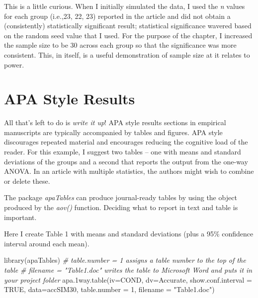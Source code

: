 \documentclass[
  english,
]{book}
\newenvironment{Shaded}{\begin{snugshade}}{\end{snugshade}}
\newcommand{\AttributeTok}[1]{\textcolor[rgb]{0.77,0.63,0.00}{#1}}
\newcommand{\CommentTok}[1]{\textcolor[rgb]{0.56,0.35,0.01}{\textit{#1}}}
\newcommand{\ConstantTok}[1]{\textcolor[rgb]{0.00,0.00,0.00}{#1}}
\newcommand{\DecValTok}[1]{\textcolor[rgb]{0.00,0.00,0.81}{#1}}
\newcommand{\FunctionTok}[1]{\textcolor[rgb]{0.00,0.00,0.00}{#1}}
\newcommand{\NormalTok}[1]{#1}
\newcommand{\StringTok}[1]{\textcolor[rgb]{0.31,0.60,0.02}{#1}}
\begin{document}
This is a little curious. When I initially simulated the data, I used the \emph{n} values for each group (i.e.,23, 22, 23) reported in the article \citep{tran_you_2014} and did not obtain a (consistently) statistically significant result; statistical significance wavered based on the random seed value that I used. For the purpose of the chapter, I increased the sample size to be 30 across each group so that the significance was more consistent. This, in itself, is a useful demonstration of sample size at it relates to power.

\hypertarget{apa-style-results}{%
\section{APA Style Results}\label{apa-style-results}}

All that's left to do is \emph{write it up}! APA style results sections in empirical manuscripts are typically accompanied by tables and figures. APA style discourages repeated material and encourages reducing the cognitive load of the reader. For this example, I suggest two tables -- one with means and standard deviations of the groups and a second that reports the output from the one-way ANOVA. In an article with multiple statistics, the authors might wish to combine or delete these.

The package \emph{apaTables} can produce journal-ready tables by using the object produced by the \emph{aov()} function. Deciding what to report in text and table is important.

Here I create Table 1 with means and standard deviations (plus a 95\% confidence interval around each mean).

\begin{Shaded}
\begin{Highlighting}[]
\FunctionTok{library}\NormalTok{(apaTables)}
\CommentTok{\# table.number = 1 assigns a table number to the top of the table }
\CommentTok{\# filename = "Table1.doc" writes the table to Microsoft Word and puts it in your project folder}
\FunctionTok{apa.1way.table}\NormalTok{(}\AttributeTok{iv=}\NormalTok{COND, }\AttributeTok{dv=}\NormalTok{Accurate, }\AttributeTok{show.conf.interval =} \ConstantTok{TRUE}\NormalTok{, }\AttributeTok{data=}\NormalTok{accSIM30, }\AttributeTok{table.number =} \DecValTok{1}\NormalTok{, }\AttributeTok{filename =} \StringTok{"Table1.doc"}\NormalTok{)}
\end{Highlighting}
\end{Shaded}
\end{document}

